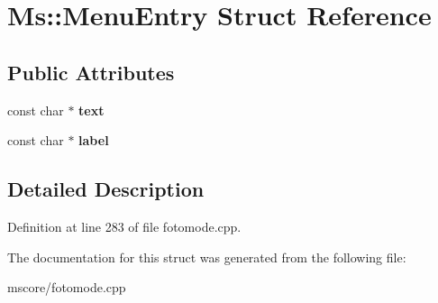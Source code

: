 \hypertarget{struct_ms_1_1_menu_entry}{}\section{Ms\+:\+:Menu\+Entry Struct Reference}
\label{struct_ms_1_1_menu_entry}
\subsection*{Public Attributes}
\begin{DoxyCompactItemize}
\item 
\mbox{\label{struct_ms_1_1_menu_entry_a6322a252845fcdad2b9d9b09a0888dee}} 
const char $\ast$ {\bfseries text}
\item 
\mbox{\label{struct_ms_1_1_menu_entry_aaab7d8a8d5be7dbc24945849dd6a396e}} 
const char $\ast$ {\bfseries label}
\end{DoxyCompactItemize}


\subsection{Detailed Description}


Definition at line 283 of file fotomode.\+cpp.



The documentation for this struct was generated from the following file\+:\begin{DoxyCompactItemize}
\item 
mscore/fotomode.\+cpp\end{DoxyCompactItemize}
